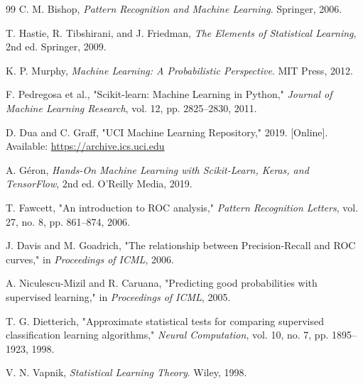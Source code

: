 \documentclass[12pt,a4paper]{article}
\begin{document}
{}
\renewcommand{\refname}{Tài liệu tham khảo}
\begin{thebibliography}{99}
C. M. Bishop, \textit{Pattern Recognition and Machine Learning}. Springer, 2006.

T. Hastie, R. Tibshirani, and J. Friedman, \textit{The Elements of Statistical Learning}, 2nd ed. Springer, 2009.

K. P. Murphy, \textit{Machine Learning: A Probabilistic Perspective}. MIT Press, 2012.

F. Pedregosa et al., "Scikit-learn: Machine Learning in Python," \textit{Journal of Machine Learning Research}, vol. 12, pp. 2825--2830, 2011.

D. Dua and C. Graff, "UCI Machine Learning Repository," 2019. [Online]. Available: \url{https://archive.ics.uci.edu}

A. Géron, \textit{Hands-On Machine Learning with Scikit-Learn, Keras, and TensorFlow}, 2nd ed. O'Reilly Media, 2019.

T. Fawcett, "An introduction to ROC analysis," \textit{Pattern Recognition Letters}, vol. 27, no. 8, pp. 861--874, 2006.

J. Davis and M. Goadrich, "The relationship between Precision-Recall and ROC curves," in \textit{Proceedings of ICML}, 2006.

A. Niculescu-Mizil and R. Caruana, "Predicting good probabilities with supervised learning," in \textit{Proceedings of ICML}, 2005.

T. G. Dietterich, "Approximate statistical tests for comparing supervised classification learning algorithms," \textit{Neural Computation}, vol. 10, no. 7, pp. 1895--1923, 1998.

V. N. Vapnik, \textit{Statistical Learning Theory}. Wiley, 1998.
\end{thebibliography}
\end{document}

